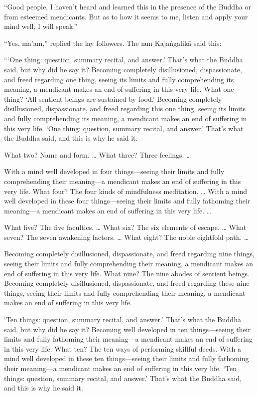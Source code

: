\documentclass[12pt,openany]{book}%
\begin{document}
“Good people, I haven’t heard and learned this in the presence of the Buddha or from esteemed mendicants. But as to how it seems to me, listen and apply your mind well, I will speak.” 

“Yes, ma’am,” replied the lay followers. The nun \textsanskrit{Kajaṅgalikā} said this: 

“‘One thing: question, summary recital, and answer.’ That’s what the Buddha said, but why did he say it? Becoming completely disillusioned, dispassionate, and freed regarding one thing, seeing its limits and fully comprehending its meaning, a mendicant makes an end of suffering in this very life. What one thing? ‘All sentient beings are sustained by food.’ Becoming completely disillusioned, dispassionate, and freed regarding this one thing, seeing its limits and fully comprehending its meaning, a mendicant makes an end of suffering in this very life. ‘One thing: question, summary recital, and answer.’ That’s what the Buddha said, and this is why he said it. 

What two? Name and form. … What three? Three feelings. … 

With a mind well developed in four things—seeing their limits and fully comprehending their meaning—a mendicant makes an end of suffering in this very life. What four? The four kinds of mindfulness meditation. … With a mind well developed in these four things—seeing their limits and fully fathoming their meaning—a mendicant makes an end of suffering in this very life. … 

What five? The five faculties. … What six? The six elements of escape. … What seven? The seven awakening factors. … What eight? The noble eightfold path. … 

Becoming completely disillusioned, dispassionate, and freed regarding nine things, seeing their limits and fully comprehending their meaning, a mendicant makes an end of suffering in this very life. What nine? The nine abodes of sentient beings. Becoming completely disillusioned, dispassionate, and freed regarding these nine things, seeing their limits and fully comprehending their meaning, a mendicant makes an end of suffering in this very life. 

‘Ten things: question, summary recital, and answer.’ That’s what the Buddha said, but why did he say it? Becoming well developed in ten things—seeing their limits and fully fathoming their meaning—a mendicant makes an end of suffering in this very life. What ten? The ten ways of performing skillful deeds. With a mind well developed in these ten things—seeing their limits and fully fathoming their meaning—a mendicant makes an end of suffering in this very life. ‘Ten things: question, summary recital, and answer.’ That’s what the Buddha said, and this is why he said it. 
\end{document}
